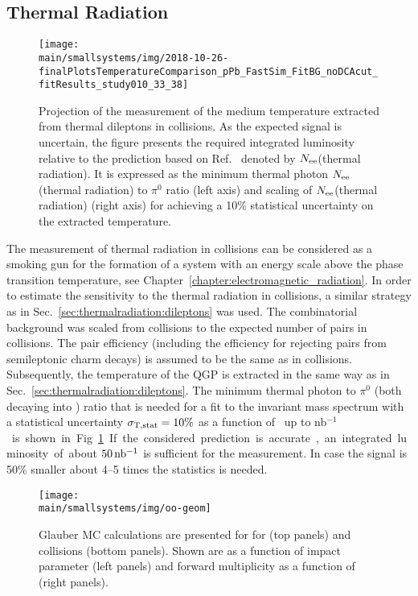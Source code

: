 \documentclass[../report.tex]{subfiles}
\providecommand{\main}{..}
\begin{document}
\subsection{Thermal Radiation}
\label{sect:smallsystems_thermalradiation}

\begin{figure}[t]
\centering
\texttt{[image: \\main/smallsystems/img/2018-10-26-finalPlotsTemperatureComparison\_pPb\_FastSim\_FitBG\_noDCAcut\_fitResults\_study010\_33\_38]}
\caption{Projection of the measurement of the medium temperature extracted from thermal dileptons in \pPb collisions. As the expected signal is uncertain, the figure presents the required integrated luminosity relative to the prediction based on Ref.~\cite{Rapp:2011is} denoted by $N_{\rm ee}$(thermal radiation). It is expressed as the minimum thermal photon $N_{\rm ee}$(thermal radiation) to $\pi^0$ ratio (left axis) and scaling of $N_{\rm ee}$(thermal radiation) (right axis) for achieving a 10\% statistical uncertainty on the extracted temperature.}
\label{fig:smallsystems_thermal_radition}
\end{figure}

The measurement of thermal radiation in \pPb collisions can be considered as a smoking gun for the formation of a system with an energy scale above the phase transition temperature, see Chapter~\ref{chapter:electromagnetic_radiation}. In order to estimate the sensitivity to the thermal radiation in \pPb collisions, a similar strategy as in Sec.~\ref{sec:thermalradiation:dileptons} was used.
The combinatorial background was scaled from \PbPb collisions to the expected number of pairs in \pPb collisions. The pair efficiency (including the efficiency for rejecting \Pepem pairs from semileptonic charm decays) is assumed to be the same as in \PbPb collisions.
Subsequently, the temperature of the QGP is extracted in the same way as in Sec.~\ref{sec:thermalradiation:dileptons}. The minimum thermal photon to $\pi^{0}$ (both decaying into \Pepem) ratio that is needed for a fit to the invariant mass spectrum with a statistical uncertainty $\sigma_{\rm T,stat} = 10\%$ as a function of \Lint\ up to \unit[2000]{nb$^{-1}$} is shown in Fig.~\ref{fig:smallsystems_thermal_radition}. If the considered prediction is accurate, an integrated luminosity of about $\unit[50]{nb^{-1}}$ is sufficient for the measurement. In case the signal is 50\% smaller about 4--5 times the statistics is needed.

\begin{figure}[t]
\centering
\texttt{[image: \\main/smallsystems/img/oo-geom]}
\caption{Glauber MC calculations are presented for for \pPb (top panels) and \OO collisions (bottom panels). Shown are \Npart as a function of impact parameter (left panels) and forward multiplicity as a function of \Npart (right panels).}
\label{fig:smallsystems_oo_glauber}
\end{figure}
\end{document}

